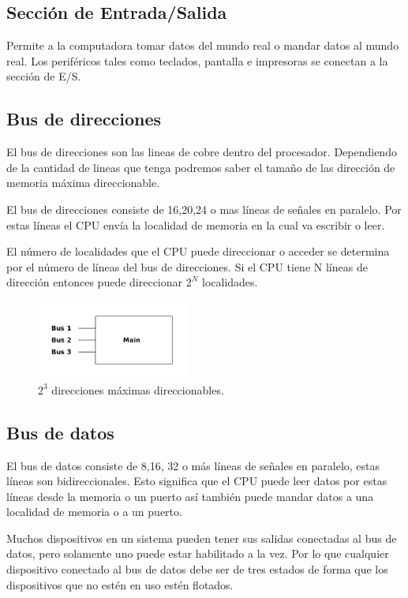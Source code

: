 \documentclass[11pt]{article}
\begin{document}
\subsection{Sección de Entrada/Salida}
\label{sec:org03436c2}
Permite a la computadora tomar datos del mundo real o mandar datos al
mundo real. Los periféricos tales como teclados, pantalla e impresoras se
conectan a la sección de E/S.

\subsection{Bus de direcciones}
\label{sec:orga61bff8}
El bus de direcciones son las lineas de cobre dentro del procesador. Dependiendo de la cantidad de lineas que tenga podremos saber el tamaño de las dirección de memoria máxima direccionable.

El bus de direcciones consiste de 16,20,24 o mas líneas de señales en
paralelo. Por estas líneas el CPU envía la localidad de memoria en la
cual va escribir o leer.

El número de localidades que el CPU puede direccionar o acceder se
determina por el número de líneas del bus de direcciones. Si el CPU
tiene N líneas de dirección entonces puede direccionar \(2^N\) localidades.

\begin{figure}[htbp]
\centering
\includegraphics[width=5cm]{./img/busdirecciones.png}
\caption{\(2^3\) direcciones máximas direccionables.}
\end{figure}

\subsection{Bus de datos}
\label{sec:org0d272cd}
El bus de datos consiste de 8,16, 32 o más líneas de señales en paralelo, estas líneas son bidireccionales. Esto significa que el CPU puede leer datos por estas líneas desde la memoria o un puerto así también puede mandar datos a una localidad de memoria o a un puerto. 

Muchos dispositivos en un sistema pueden tener sus salidas conectadas al bus de datos, pero solamente uno puede estar habilitado a la vez. Por lo que cualquier dispositivo conectado al bus de datos debe ser de tres estados de forma que los dispositivos que no estén en uso estén flotados.
\end{document}
